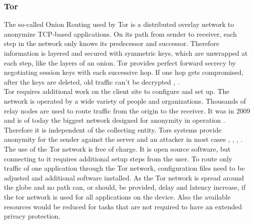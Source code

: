     \subsubsection{Tor}
        The so-called Onion Routing used  by Tor is a distributed overlay network to anonymize TCP-based applications. On its path from sender to receiver, each step in the network only knows its predecessor and successor. Therefore information is layered and secured with symmetric keys, which are unwrapped at each step, like the layers of an onion.
        Tor provides perfect forward secrecy by negotiating session keys with each successive hop. If one hop gets compromised, after the keys are deleted, old traffic can't be decrypted \cite{dingledine_tor_2004}, \cite{borisov_shining_2008}.\\
        Tor requires additional work on the client site to configure and set up. 
        The network is operated by a wide variety of people and organizations.
        Thousands of relay nodes are used to route traffic from the origin to the receiver. It was in 2009 and is of today the biggest network designed for anonymity in operation \cite{edman_anonymity_2009}.
        Therefore it is independent of the collecting entity. Tors systems provide anonymity for the sender against the server and an attacker in most cases \cite{arma_one_2009},  \cite{poulsen_feds_2013}, \cite{samson_tor_2013}, \cite{herrmann_website_2009}.\\
        The use of the Tor network is free of charge. It is open source software, but connecting to it requires additional setup steps from the user. To route only traffic of one application through the Tor network, configuration files need to be adjusted and additional software installed. As the Tor network is spread around the globe and no path can, or should, be provided, delay and latency increase, if the tor network is used for all applications on the device. Also the available resources would be reduced for tasks that are not required to have an extended privacy protection.\\
    
